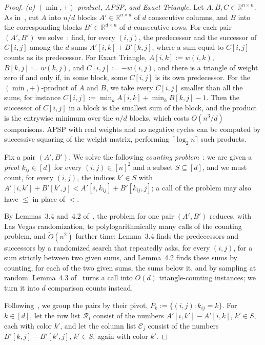 \begin{proof}
\emph{(a) $(\min,+)$-product, APSP, and Exact Triangle.} Let $A,B,C\in\mathbb R^{n\times n}$. As in~\cite[Section~3.2]{CVX22}, cut $A$ into $n/d$ blocks $A'\in\mathbb R^{n\times d}$ of $d$ consecutive columns, and $B$ into the corresponding blocks $B'\in\mathbb R^{d\times n}$ of $d$ consecutive rows. For each pair $(A',B')$ we solve~\cite[Problem~3.2]{CVX22}: find, for every $(i,j)$, the predecessor and the successor of $C[i,j]$ among the $d$ sums $A'[i,k]+B'[k,j]$, where a sum equal to $C[i,j]$ counts as its predecessor. For Exact Triangle, $A[i,k]:=w(i,k)$, $B[k,j]:=w(k,j)$, and $C[i,j]:=-w(i,j)$, and there is a triangle of weight zero if and only if, in some block, some $C[i,j]$ is its own predecessor. For the $(\min,+)$-product of $A$ and $B$, we take every $C[i,j]$ smaller than all the sums, for instance $C[i,j]:=\min_k A[i,k]+\min_k B[k,j]-1$. Then the successor of $C[i,j]$ in a block is the smallest sum of the block, and the product is the entrywise minimum over the $n/d$ blocks, which costs $O(n^3/d)$ comparisons. APSP with real weights and no negative cycles can be computed by successive squaring of the weight matrix, performing $\lceil\log_2n\rceil$ such products.

Fix a pair $(A',B')$.  We solve the following \emph{counting problem}~\cite[Problem~4.1]{CVX22}: we are given a \emph{pivot} $k_{ij}\in[d]$ for every $(i,j)\in[n]^2$ and a subset $S\subseteq[d]$, and we must count, for every $(i,j)$, the indices $k'\in S$ with $A'[i,k']+B'[k',j]<A'[i,k_{ij}]+B'[k_{ij},j]$; a call of the problem may also have $\le$ in place of $<$. 

By Lemmas~3.4 and~4.2 of~\cite{CVX22}, the problem for one pair $(A',B')$ reduces, with Las Vegas randomization, to polylogarithmically many calls of the counting problem, and $\tilde{O}(n^2)$ further time: Lemma~3.4 finds the predecessors and successors by a randomized search that repeatedly asks, for every $(i,j)$, for a sum strictly between two given sums, and Lemma~4.2 finds these sums by counting, for each of the two given sums, the sums below it, and by sampling at random. Lemma~4.3 of~\cite{CVX22} turns a call into $O(d)$ triangle-counting instances; we turn it into $d$ comparison counts instead. 

Following~\cite{CVX22}, we group the pairs by their pivot, $P_k:=\{(i,j):k_{ij}=k\}$. For $k\in[d]$, let the row list $\mathcal R_i$ consist of the numbers $A'[i,k']-A'[i,k]$, $k'\in S$, each with color $k'$, and let the column list $\mathcal C_j$ consist of the numbers $B'[k,j]-B'[k',j]$, $k'\in S$, again with color $k'$.


\end{proof}
